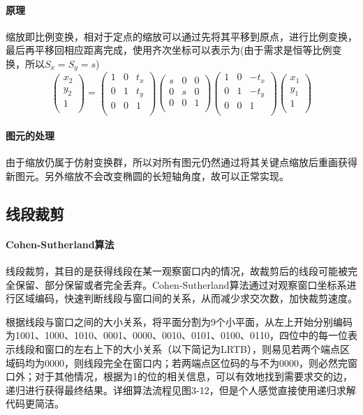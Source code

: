 \documentclass[a4paper,UTF8]{article}
\theoremstyle{definition}
\begin{document}
\paragraph{原理} 缩放即比例变换，相对于定点的缩放可以通过先将其平移到原点，进行比例变换，最后再平移回相应距离完成，使用齐次坐标可以表示为(由于需求是恒等比例变换，所以$S_x=S_y=s$)
\begin{equation}
\left(
\begin{array}{c}
x_2 \\
y_2 \\
1 \\
\end{array}
\right)
=
\left(
\begin{array}{ccc}
1 & 0 & t_x \\
0 & 1 & t_y \\
0 & 0 & 1 \\
\end{array}
\right)
\left(
\begin{array}{ccc}
s & 0 & 0 \\
0 & s & 0 \\
0 & 0 & 1 \\
\end{array}
\right)
\left(
\begin{array}{ccc}
1 & 0 & -t_x \\
0 & 1 & -t_y \\
0 & 0 & 1 \\
\end{array}
\right)
\left(
\begin{array}{c}
x_1 \\
y_1 \\
1 \\
\end{array}
\right)
\end{equation}
\paragraph{图元的处理}
由于缩放仍属于仿射变换群，所以对所有图元仍然通过将其关键点缩放后重画获得新图元。另外缩放不会改变椭圆的长短轴角度，故可以正常实现。
\subsection{线段裁剪}
\paragraph{Cohen-Sutherland算法}
线段裁剪，其目的是获得线段在某一观察窗口内的情况，故裁剪后的线段可能被完全保留、部分保留或者完全丢弃。Cohen-Sutherland算法通过对观察窗口坐标系进行区域编码，快速判断线段与窗口间的关系，从而减少求交次数，加快裁剪速度。
\par 根据线段与窗口之间的大小关系，将平面分割为9个小平面，从左上开始分别编码为1001、1000、1010、0001、0000、0010、0101、0100、0110，四位中的每一位表示线段和窗口的左右上下的大小关系（以下简记为LRTB），则易见若两个端点区域码均为0000，则线段完全在窗口内；若两端点区位码的与不为0000，则必然完窗口外；对于其他情况，根据为1的位的相关信息，可以有效地找到需要求交的边，递归进行获得最终结果。详细算法流程见图3-12，但是个人感觉直接使用递归求解代码更简洁。
\end{document}
